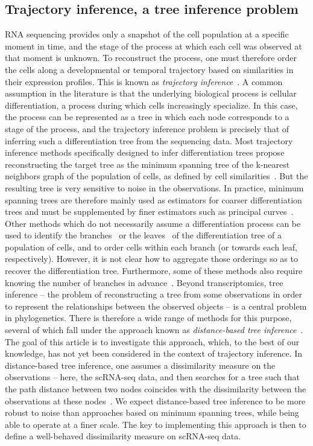 \documentclass[pdflatex,sn-mathphys-num]{sn-jnl}%
\theoremstyle{thmstyleone}%
\theoremstyle{thmstyletwo}%
\theoremstyle{thmstylethree}%
\begin{document}
\subsection{Trajectory inference, a tree inference problem} 
RNA sequencing provides only a snapshot of the cell population at a specific moment in time, and the stage of the process at which each cell was observed at that moment is unknown. To reconstruct the process, one must therefore order the cells along a developmental or temporal trajectory based on similarities in their expression profiles. This is known as \textit{trajectory inference}~\cite{saelens_comparison_2019}. A common assumption in the literature is that the underlying biological process is cellular differentiation, a process during which cells increasingly specialize. In this case, the process can be represented as a tree in which each node corresponds to a stage of the process, and the trajectory inference problem is precisely that of inferring such a differentiation tree from the sequencing data. Most trajectory inference methods specifically designed to infer differentiation trees propose reconstructing the target tree as the minimum spanning tree of the k-nearest neighbors graph of the population of cells, as defined by cell similarities~\cite{street_slingshot_2018, qiu_monocle_2021}. But the resulting tree is very sensitive to noise in the observations. In practice, minimum spanning trees are therefore mainly used as estimators for coarser differentiation trees and must be supplemented by finer estimators such as principal curves~\cite{street_slingshot_2018}. Other methods which do not necessarily assume a differentiation process can be used to identify the branches~\cite{weng_vetra_2021, zhang_cellpath_2021} or the leaves~\cite{setty_palantir_2019, lange_cellrank_2022} of the differentiation tree of a population of cells, and to order cells within each branch (or towards each leaf, respectively). However, it is not clear how to aggregate those orderings so as to recover the differentiation tree. Furthermore, some of these methods also require knowing the number of branches in advance~\cite{weng_vetra_2021, zhang_cellpath_2021}. Beyond transcriptomics, tree inference -- the problem of reconstructing a tree from some observations in order to represent the relationships between the observed objects -- is a central problem in phylogenetics. There is therefore a wide range of methods for this purpose, several of which fall under the approach known as \textit{distance-based tree inference}~\cite{pardi_combinatorics_2012}. The goal of this article is to investigate this approach, which, to the best of our knowledge, has not yet been considered in the context of trajectory inference. In distance-based tree inference, one assumes a dissimilarity measure on the observations -- here, the scRNA-seq data, and then searches for a tree such that the path distance between two nodes coincides with the dissimilarity between the observations at these nodes~\cite{sokal_upgma_1958, saitou_nj_1987, lefort_fastme_2015}. We expect distance-based tree inference to be more robust to noise than approaches based on minimum spanning trees, while being able to operate at a finer scale. The key to implementing this approach is then to define a well-behaved dissimilarity measure on scRNA-seq data. 
\end{document}
